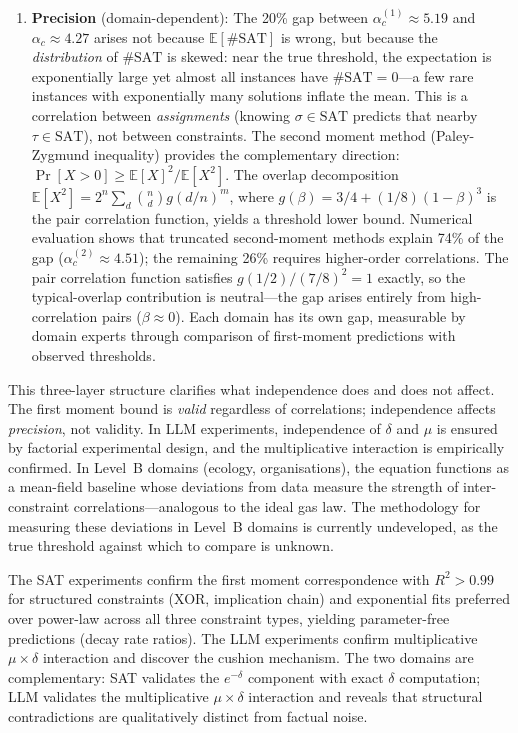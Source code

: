 \documentclass[11pt,a4paper]{article}
\begin{document}
\begin{enumerate}
    \item \textbf{Precision} (domain-dependent): The 20\% gap between $\alpha_c^{(1)} \approx 5.19$ and $\alpha_c \approx 4.27$ arises not because $\mathbb{E}[\#\text{SAT}]$ is wrong, but because the \emph{distribution} of $\#\text{SAT}$ is skewed: near the true threshold, the expectation is exponentially large yet almost all instances have $\#\text{SAT} = 0$---a few rare instances with exponentially many solutions inflate the mean. This is a correlation between \emph{assignments} (knowing $\sigma \in \text{SAT}$ predicts that nearby $\tau \in \text{SAT}$), not between constraints. The second moment method (Paley-Zygmund inequality) provides the complementary direction: $\Pr[X > 0] \geq \mathbb{E}[X]^2 / \mathbb{E}[X^2]$. The overlap decomposition $\mathbb{E}[X^2] = 2^n \sum_d \binom{n}{d} g(d/n)^m$, where $g(\beta) = 3/4 + (1/8)(1-\beta)^3$ is the pair correlation function, yields a threshold lower bound. Numerical evaluation shows that truncated second-moment methods explain 74\% of the gap ($\alpha_c^{(2)} \approx 4.51$); the remaining 26\% requires higher-order correlations. The pair correlation function satisfies $g(1/2)/(7/8)^2 = 1$ exactly, so the typical-overlap contribution is neutral---the gap arises entirely from high-correlation pairs ($\beta \approx 0$). Each domain has its own gap, measurable by domain experts through comparison of first-moment predictions with observed thresholds.
\end{enumerate}

\noindent This three-layer structure clarifies what independence does and does not affect. The first moment bound is \emph{valid} regardless of correlations; independence affects \emph{precision}, not validity. In LLM experiments, independence of $\delta$ and $\mu$ is ensured by factorial experimental design, and the multiplicative interaction is empirically confirmed. In Level~B domains (ecology, organisations), the equation functions as a mean-field baseline whose deviations from data measure the strength of inter-constraint correlations---analogous to the ideal gas law. The methodology for measuring these deviations in Level~B domains is currently undeveloped, as the true threshold against which to compare is unknown.

The SAT experiments confirm the first moment correspondence with $R^2 > 0.99$ for structured constraints (XOR, implication chain) and exponential fits preferred over power-law across all three constraint types, yielding parameter-free predictions (decay rate ratios). The LLM experiments confirm multiplicative $\mu \times \delta$ interaction and discover the cushion mechanism. The two domains are complementary: SAT validates the $e^{-\delta}$ component with exact $\delta$ computation; LLM validates the multiplicative $\mu \times \delta$ interaction and reveals that structural contradictions are qualitatively distinct from factual noise.
\end{document}
